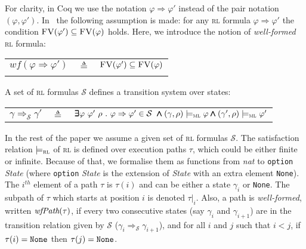 \documentclass[conference]{IEEEtran}
\newcommand{\eqbydef}{\triangleq}
\renewcommand{\S}{\mathcal{S}}
\newcommand{\tran}[2]{\Ra^{\!#1}_{\!#2}}
\newcommand{\Ra}{\Rightarrow}
\newcommand{\FreeVars}{\mathit{\textsc{FV}}}
\newcommand{\ML}{\textsc{ml}\xspace}
\newcommand{\RL}{\textsc{rl}\xspace}
\newcommand{\rrule}[2]{{#1} \Ra{#2}}
\newcommand{\modelsml}{\models_\ML}
\newcommand{\modelsrl}{\models_\RL}
\newcommand{\coq}[1]{{\small \textit{#1}}}
\newcommand{\coqtt}[1]{{\small \texttt{#1}}}
\newcommand{\cand}{\pmb{\land}}
\newcommand{\cexists}{\pmb{\exists}}
\newcommand{\wf}[1]{\mathit{wf}({#1})}
\begin{document}
\noindent
For clarity, in Coq we use the notation $\rrule{\varphi}{\varphi'}$ instead of the pair notation $(\varphi, \varphi')$. 
In~\cite{lucanu-rusu-arusoaie-nowak-LRC2015} the following assumption is made: for any \RL formula $\rrule{\varphi}{\varphi'}$ the condition $\FreeVars(\varphi') \subseteq \FreeVars(\varphi)$ holds. 
Here, we introduce the notion of \emph{well-formed} \RL formula:\\

\begin{minipage}{\textwidth}
\begin{tabular}{lll}
$\wf{\rrule{\varphi}{\varphi'}}$ & $\eqbydef$& $\FreeVars(\varphi') \subseteq \FreeVars(\varphi)$\\\\
\end{tabular}
\end{minipage}


\noindent
A set of \RL formulas $\S$ defines a transition system over states:\\

\begin{minipage}{\textwidth}
\begin{tabular}{lcl}
$\gamma \tran{}{\S} \gamma'$ &$\eqbydef$& $\cexists \varphi~\varphi'~\rho~.~\rrule{\varphi}{\varphi'} \in \S~\cand (\gamma, \rho) \modelsml \varphi \cand (\gamma', \rho) \modelsml \varphi'$ \\[2ex]
\end{tabular}
\end{minipage}

\noindent
In the rest of the paper we assume a given set of \RL formulas $\S$.
The satisfaction relation $\modelsrl$ of \RL  is defined over execution paths $\tau$, which could be either finite or infinite. 
Because of that, we formalise them as functions from \coq{nat} to \coqtt{option} \coq{State} (where \coqtt{option} \coq{State} is the extension of \coq{State} with an extra element \coqtt{None}).
The $i^\mathit{th}$ element of a path $\tau$ is $\tau(i)$ and can be either a state $\gamma_i$ or \coqtt{None}. 
The subpath of $\tau$ which starts at position $i$ is denoted $\tau|_i$.
Also, a path is \emph{well-formed}, written $\coq{wfPath}(\tau)$, if every two consecutive states (say $\gamma_i$ and $\gamma_{i+1}$) are in the transition relation given by $\S$ ($\gamma_i \tran{}{\S} \gamma_{i+1}$), and for all $i$ and $j$ such that $i < j$, if $\tau(i) = \coqtt{None}$ then $\tau(j) = \coqtt{None}$.
\end{document}

